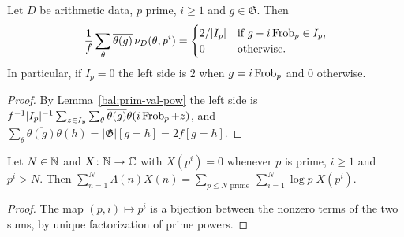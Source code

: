 \begin{lemma}\label{bal:ortho}
Let $D$ be arithmetic data, $p$ prime, $i\ge1$ and $g\in\mathfrak G$. Then
\[\frac1f\sum_{\theta}\overline{\theta(g)}\,\nu_D(\theta,p^i)=\begin{cases}2/|I_p| & \text{if } g-i\operatorname{Frob}_p\in I_p,\\ 0&\text{otherwise.}\end{cases}\]
In particular, if $I_p=0$ the left side is $2$ when $g=i\operatorname{Frob}_p$ and $0$ otherwise.
\end{lemma}
\begin{proof}
By Lemma~\ref{bal:prim-val-pow} the left side is $f^{-1}|I_p|^{-1}\sum_{z\in I_p}\sum_{\theta}\overline{\theta(g)}\theta(i\operatorname{Frob}_p+z)$, and $\sum_{\theta}\overline{\theta(g)}\theta(h)=|\mathfrak G|[g=h]=2f[g=h]$.
\end{proof}

\begin{lemma}\label{bal:vonmangoldt-pp}
Let $N\in\mathbb{N}$ and $X\colon\mathbb{N}\to\mathbb{C}$ with $X(p^i)=0$ whenever $p$ is prime, $i\ge1$ and $p^i>N$. Then
$\sum_{n=1}^N\Lambda(n)X(n)=\sum_{p\le N\text{ prime}}\ \sum_{i=1}^N\log p\;X(p^i)$.
\end{lemma}
\begin{proof}
The map $(p,i)\mapsto p^i$ is a bijection between the nonzero terms of the two sums, by unique factorization of prime powers.
\end{proof}

